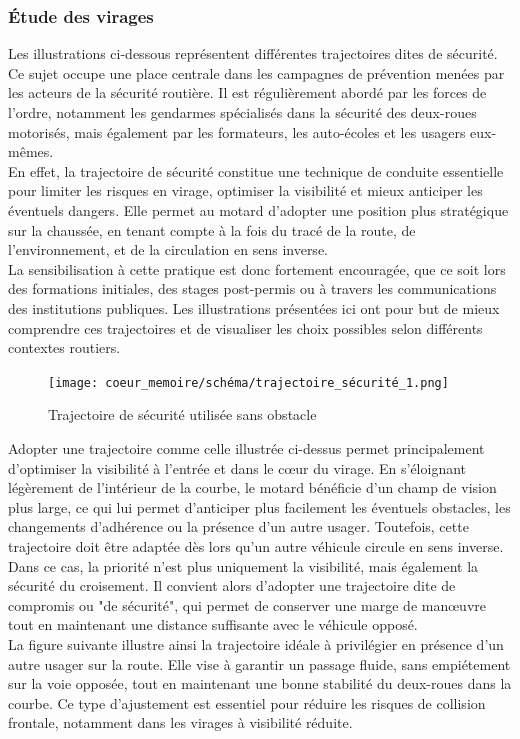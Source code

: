 \subsubsection{Étude des virages}
Les illustrations ci-dessous représentent différentes trajectoires dites de sécurité. Ce sujet occupe une place centrale dans les campagnes de prévention menées par les acteurs de la sécurité routière. Il est régulièrement abordé par les forces de l’ordre, notamment les gendarmes spécialisés dans la sécurité des deux-roues motorisés, mais également par les formateurs, les auto-écoles et les usagers eux-mêmes.\\
En effet, la trajectoire de sécurité constitue une technique de conduite essentielle pour limiter les risques en virage, optimiser la visibilité et mieux anticiper les éventuels dangers. Elle permet au motard d’adopter une position plus stratégique sur la chaussée, en tenant compte à la fois du tracé de la route, de l’environnement, et de la circulation en sens inverse.\\
La sensibilisation à cette pratique est donc fortement encouragée, que ce soit lors des formations initiales, des stages post-permis ou à travers les communications des institutions publiques. Les illustrations présentées ici ont pour but de mieux comprendre ces trajectoires et de visualiser les choix possibles selon différents contextes routiers.
\begin{figure}[H]
    \centering
    \texttt{[image: coeur\_memoire/schéma/trajectoire\_sécurité\_1.png]} 
    \caption{Trajectoire de sécurité utilisée sans obstacle}
\end{figure}
Adopter une trajectoire comme celle illustrée ci-dessus permet principalement d’optimiser la visibilité à l’entrée et dans le cœur du virage. En s’éloignant légèrement de l’intérieur de la courbe, le motard bénéficie d’un champ de vision plus large, ce qui lui permet d’anticiper plus facilement les éventuels obstacles, les changements d’adhérence ou la présence d’un autre usager.
Toutefois, cette trajectoire doit être adaptée dès lors qu’un autre véhicule circule en sens inverse. Dans ce cas, la priorité n’est plus uniquement la visibilité, mais également la sécurité du croisement. Il convient alors d’adopter une trajectoire dite de compromis ou "de sécurité", qui permet de conserver une marge de manœuvre tout en maintenant une distance suffisante avec le véhicule opposé.\\
La figure suivante illustre ainsi la trajectoire idéale à privilégier en présence d’un autre usager sur la route. Elle vise à garantir un passage fluide, sans empiétement sur la voie opposée, tout en maintenant une bonne stabilité du deux-roues dans la courbe. Ce type d’ajustement est essentiel pour réduire les risques de collision frontale, notamment dans les virages à visibilité réduite.
